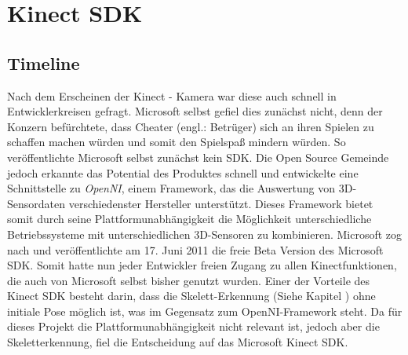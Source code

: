 \section{Kinect SDK}\label{SDK}
%
%
%
%
%
%

	
\subsection{Timeline}
Nach dem Erscheinen der Kinect - Kamera war diese auch schnell in Entwicklerkreisen gefragt. Microsoft selbst gefiel dies zunächst nicht, denn der Konzern befürchtete, dass Cheater (engl.: Betrüger) sich an ihren Spielen zu schaffen machen würden und somit den Spielspaß mindern würden. So veröffentlichte Microsoft selbst zunächst kein SDK. Die Open Source Gemeinde jedoch erkannte das Potential des Produktes schnell und entwickelte eine Schnittstelle zu \textit{OpenNI}, einem Framework, das die Auswertung von 3D-Sensordaten verschiedenster Hersteller unterstützt. Dieses Framework bietet somit durch seine Plattformunabhängigkeit die Möglichkeit unterschiedliche Betriebssysteme mit unterschiedlichen 3D-Sensoren zu kombinieren.\cite{webb2012beginning}
Microsoft zog nach und veröffentlichte am 17. Juni 2011 die freie Beta Version des Microsoft SDK. Somit hatte nun jeder Entwickler freien Zugang zu allen Kinectfunktionen, die auch von Microsoft selbst bisher genutzt wurden. Einer der Vorteile des Kinect SDK besteht darin, dass die Skelett-Erkennung (Siehe Kapitel ) ohne initiale Pose möglich ist, was im Gegensatz zum OpenNI-Framework steht. \cite{webb2012beginning} Da für dieses Projekt die Plattformunabhängigkeit nicht relevant ist, jedoch aber die Skeletterkennung, fiel die Entscheidung auf das Microsoft Kinect SDK.

